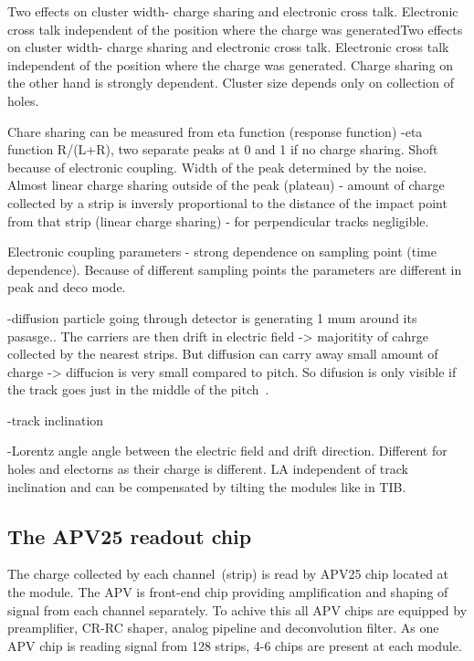 Two effects on cluster width-  charge sharing and electronic cross talk. Electronic cross talk independent of the position where the charge was generatedTwo effects on cluster width-  charge sharing and electronic cross talk. Electronic cross talk independent of the position where the charge was generated. Charge sharing on the other hand is strongly dependent. Cluster size depends only on collection of holes.

Chare sharing can be measured from eta function (response function) -eta function R/(L+R), two separate peaks at 0 and 1 if no charge sharing. Shoft because of electronic coupling. Width of the peak determined by the noise. Almost linear charge sharing outside of the peak (plateau) - amount of charge collected by a strip is inversly proportional to the distance of the impact point from that strip (linear charge sharing) - for perpendicular tracks negligible.


Electronic coupling parameters - strong dependence on sampling point (time dependence). Because of different sampling points the parameters are different in peak and deco mode.

-diffusion
particle going through detector is generating 1 mum around its pasasge.. The carriers are then drift in electric field -> majoritity of cahrge collected by the nearest strips. But diffusion can carry away small amount of charge -> diffucion is very small compared to pitch. So difusion is only visible if the track goes just in the middle of the pitch~\cite{Bloch:2007zza}.

-track inclination

-Lorentz angle
angle between the electric field and drift direction. Different for holes and electorns as their charge is different. LA independent of track inclination and can be compensated by tilting the modules like in TIB.

\subsection{The APV25 readout chip}

The charge collected by each channel~(strip) is read by APV25 chip located at the module. The APV is front-end chip providing amplification and shaping of signal from each channel separately. To achive this all APV chips are equipped by preamplifier, CR-RC shaper, analog pipeline and deconvolution filter. As one APV chip is reading signal from 128 strips, 4-6 chips are present at each module.


